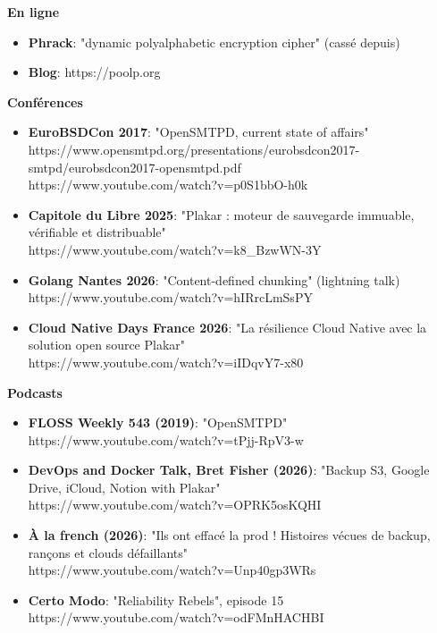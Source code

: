 \documentclass[a4paper,10pt]{letter}
\begin{document}
\textbf{En ligne}
\begin{itemize}
\item	\textbf{Phrack}: "dynamic polyalphabetic encryption cipher" (cass\'e depuis)
\item	\textbf{Blog}: https://poolp.org\\
\end{itemize}

\textbf{Conf\'erences}
\begin{itemize}
\item	\textbf{EuroBSDCon 2017}: "OpenSMTPD, current state of affairs"\\
  https://www.opensmtpd.org/presentations/eurobsdcon2017-smtpd/eurobsdcon2017-opensmtpd.pdf\\
  https://www.youtube.com/watch?v=p0S1bbO-h0k\\
\item	\textbf{Capitole du Libre 2025}: "Plakar : moteur de sauvegarde immuable, v\'erifiable et distribuable"\\
  https://www.youtube.com/watch?v=k8\_BzwWN-3Y\\
\item	\textbf{Golang Nantes 2026}: "Content-defined chunking" (lightning talk)\\
  https://www.youtube.com/watch?v=hIRrcLmSsPY\\
\item	\textbf{Cloud Native Days France 2026}: "La r\'esilience Cloud Native avec la solution open source Plakar"\\
  https://www.youtube.com/watch?v=iIDqvY7-x80\\
\end{itemize}

\textbf{Podcasts}
\begin{itemize}
\item	\textbf{FLOSS Weekly 543 (2019)}: "OpenSMTPD"\\
  https://www.youtube.com/watch?v=tPjj-RpV3-w\\
\item	\textbf{DevOps and Docker Talk, Bret Fisher (2026)}: "Backup S3, Google Drive, iCloud, Notion with Plakar"\\
  https://www.youtube.com/watch?v=OPRK5osKQHI\\
\item	\textbf{\`A la french (2026)}: "Ils ont effac\'e la prod ! Histoires v\'ecues de backup, ran\c{c}ons et clouds d\'efaillants"\\
  https://www.youtube.com/watch?v=Unp40gp3WRs\\
\item	\textbf{Certo Modo}: "Reliability Rebels", episode 15\\
  https://www.youtube.com/watch?v=odFMnHACHBI\\
\end{itemize}
\end{document}
